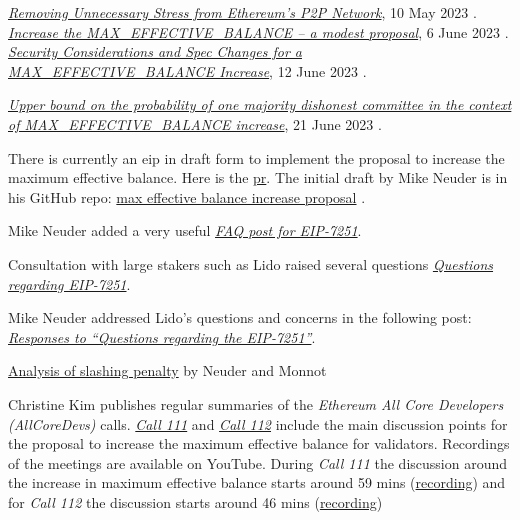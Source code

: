 \begin{bibliography}
  \bibitem \href{https://ethresear.ch/t/removing-unnecessary-stress-from-ethereums-p2p-network/15547}{\textit{Removing Unnecessary Stress from Ethereum’s P2P Network}}, 10 May 2023 \cite{Asgaonkar2023}.
\bibitem \href{https://ethresear.ch/t/increase-the-max-effective-balance-a-modest-proposal/15801/3}{\textit{Increase the MAX\_EFFECTIVE\_BALANCE – a modest proposal}}, 6 June 2023 \cite{Neuder2023a}.
\bibitem \href{https://notes.ethereum.org/nHqON5l7SACkL\_nPwz8Vqw}{\textit{Security Considerations and Spec Changes for a MAX\_EFFECTIVE\_BALANCE Increase}}, 12 June 2023 \cite{Neuder2023b}.

\bibitem \href{https://hackmd.io/@0g8QuqEeQBe45CC8toURGw/HylpAVzIH2}{\textit{Upper bound on the probability of one majority dishonest committee in the context of MAX\_EFFECTIVE\_BALANCE increase}}, 21 June 2023 \cite{Saltini2023}.

\bibitem There is currently an \gls{eip} in draft form to implement the proposal to increase the maximum effective balance. Here is the \href{https://github.com/ethereum/EIPs/pull/7251/commits/ec37fceec914af2a3fd298ef6f6cc13b5d41c533#diff-0e923b63b339f877c14b995b0c69d4962489dce485fb0e31ef49a4dd303e0b56}{\gls{pr}}. The initial draft by Mike Neuder is in his GitHub repo: \href{https://github.com/michaelneuder/EIPs/blob/max-eb-increase/EIPS/eip-increase-MaxEB.md}{max effective balance increase proposal} \cite{Neuder2023c}.

\bibitem Mike Neuder added a very useful \href{https://notes.ethereum.org/@mikeneuder/eip-7251-faq}{\textit{FAQ post for EIP-7251}}.

\bibitem Consultation with large stakers such as Lido raised several questions \href{https://hackmd.io/wPqtVNjPTYa_tO5HEtq4_g}{\textit{Questions regarding EIP-7251}}.

\bibitem Mike Neuder addressed Lido's questions and concerns in the following post: \href{https://docs.google.com/document/d/17R_OaZSqTG-zbDPdWy2sB280TBPIgMRA-zVEP-N4TQk/edit#heading=h.auj94rdsub84}{\textit{Responses to ``Questions regarding the EIP-7251''}}.

\bibitem \href{https://notes.ethereum.org/@mikeneuder/slashings-eip-7251}{Analysis of slashing penalty} by Neuder and Monnot \cite{Neuder2023d}

\bibitem Christine Kim publishes regular summaries of the \textit{Ethereum All Core Developers (AllCoreDevs)} calls. \href{https://www.galaxy.com/research/insights/ethereum-all-core-developers-consensus-call-111/}{\textit{Call 111}} and \href{https://www.galaxy.com/research/insights/ethereum-all-core-developers-consensus-call-112/}{\textit{Call 112}} include the main discussion points for the proposal to increase the maximum effective balance for validators. Recordings of the meetings are available on YouTube. During \textit{Call 111} the discussion around the increase in maximum effective balance starts around 59 mins (\href{https://youtu.be/ybgQuRcz9sg?t=3569}{recording}) and for \textit{Call 112} the discussion starts around 46 mins (\href{https://youtu.be/zdqtl9x\_UjA?t=2775}{recording})
\end{bibliography}
